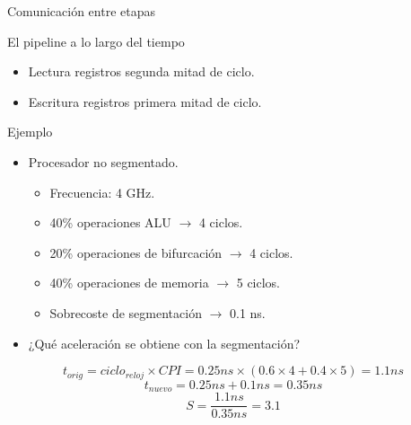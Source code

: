 \begin{frame}[t,shrink=2]{Comunicación entre etapas}

\end{frame}

\begin{frame}[t]{El pipeline a lo largo del tiempo}

\begin{itemize}
  \item Lectura registros segunda mitad de ciclo.
  \item Escritura registros primera mitad de ciclo.
\end{itemize}
\end{frame}

\begin{frame}[t]{Ejemplo}
\begin{itemize}
  \item Procesador no segmentado.
    \begin{itemize}
      \item Frecuencia: 4 GHz.
      \item 40\% operaciones ALU $\rightarrow$ 4 ciclos.
      \item 20\% operaciones de bifurcación $\rightarrow$ 4 ciclos.
      \item 40\% operaciones de memoria $\rightarrow$ 5 ciclos.
      \item Sobrecoste de segmentación $\rightarrow$ 0.1 ns.
    \end{itemize}
  \item ¿Qué aceleración se obtiene con la segmentación?
\end{itemize}
\[
t_{orig} = ciclo_{reloj} \times CPI = 0.25 ns \times (0.6 \times 4 + 0.4 \times 5) = 1.1 ns
\]
\[
t_{nuevo} = 0.25 ns + 0.1 ns = 0.35 ns
\]
\[
S = \frac{1.1 ns}{0.35 ns} = 3.1
\]
\end{frame}

